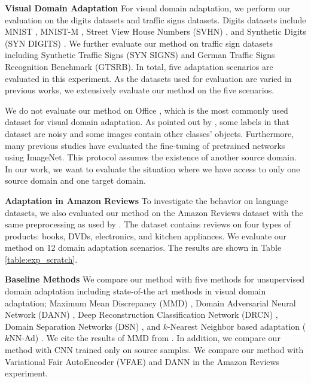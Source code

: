 \documentclass{article}
\begin{document}
\textbf{Visual Domain Adaptation}
For visual domain adaptation, we perform our evaluation on the digits datasets and traffic signs datasets. Digits datasets include MNIST \cite{lecun1998gradient}, MNIST-M \cite{ganin2014unsupervised}, Street View House Numbers (SVHN) \cite{netzer2011reading}, and Synthetic Digits (SYN DIGITS) \cite{ganin2014unsupervised}. We further evaluate our method on traffic sign datasets including Synthetic Traffic Signs (SYN SIGNS) \cite{moiseev2013evaluation} and German Traffic Signs Recognition Benchmark \cite{stallkamp2011german} (GTSRB). In total, five adaptation scenarios are evaluated in this experiment. As the datasets used for evaluation are varied in previous works, we extensively evaluate our method on the five scenarios.

We do not evaluate our method on Office \cite{saenko2010adapting}, which is the most commonly used dataset for visual domain adaptation. As pointed out by \cite{bousmalis2016domain}, some labels in that dataset are noisy and some images contain other classes' objects.
Furthermore, many previous studies have evaluated the fine-tuning of pretrained networks using ImageNet. This protocol assumes the existence of another source domain. In our work, we want to evaluate the situation where we have access to only one source domain and one target domain.

\textbf{Adaptation in Amazon Reviews}
To investigate the behavior on language datasets, we also evaluated our method on the Amazon Reviews dataset \cite{blitzer2006domain} with the same preprocessing as used by \cite{coda,ganin2016domain}. The dataset contains reviews on four types of products: books, DVDs, electronics, and kitchen appliances.
We evaluate our method on 12 domain adaptation scenarios.
The results are shown in Table \ref{table:exp_scratch}.

\textbf{Baseline Methods}
We compare our method with five methods for unsupervised domain adaptation including state-of-the art methods in visual domain adaptation; Maximum Mean Discrepancy (MMD) \cite{long2015learning}, Domain Adversarial Neural Network (DANN) \cite{ganin2014unsupervised}, Deep Reconstruction Classification Network (DRCN) \cite{ghifary2016deep}, Domain Separation Networks (DSN) \cite{bousmalis2016domain}, and $k$-Nearest Neighbor based adaptation ($k$NN-Ad) \cite{sener2016learning}. We cite the results of MMD from \cite{bousmalis2016domain}. In addition, we compare our method with CNN trained only on source samples. We compare our method with Variational Fair AutoEncoder (VFAE) \cite{louizos2015variational} and DANN \cite{ganin2016domain} in the Amazon Reviews experiment. 
\end{document}
